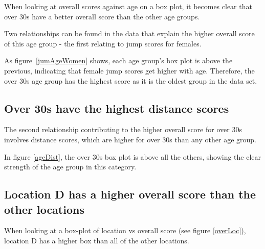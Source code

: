 \documentclass[runningheads]{llncs}
\begin{document}
When looking at overall scores against age on a box plot, it becomes clear that over 30s have a better overall score than the other age groups.

Two relationships can be found in the data that explain the higher overall score of this age group - the first relating to jump scores for females.

As figure~\ref{jumAgeWomen} shows, each age group's box plot is above the previous, indicating that female jump scores get higher with age. Therefore, the over 30s age group has the highest score as it is the oldest group in the data set.

\subsection{Over 30s have the highest distance scores}

The second relationship contributing to the higher overall score for over 30s involves distance scores, which are higher for over 30s than any other age group.

In figure \ref{ageDist}, the over 30s box plot is above all the others, showing the clear strength of the age group in this category.

\subsection{Location D has a higher overall score than the other locations}
When looking at a box-plot of location vs overall score (see figure \ref{overLoc}), location D has a higher box than all of the other locations.



\end{document}
